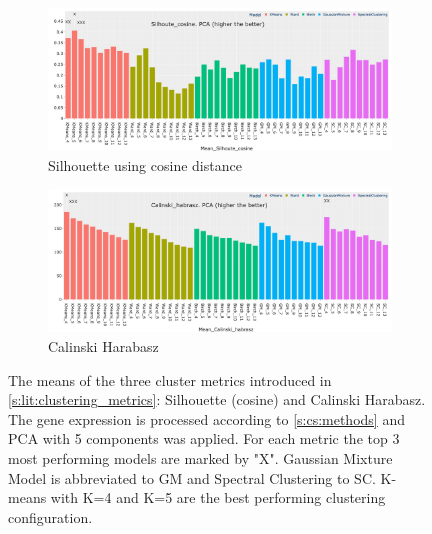 \begin{figure}[!t]
    \captionsetup[subfigure]{justification=Centering}
    \centering
    \begin{subfigure}[!t]{1.0\textwidth}
        \includegraphics[width=\textwidth,keepaspectratio]{Sections/ClusteringAnalysis/Resources/cs_top3/PCA_top3_Silhoute_cosine.png}
        \caption{Silhouette using cosine distance}
        \label{fig:cs:cosine}
    \end{subfigure}
    \centering
    \begin{subfigure}[!t]{1.0\textwidth}
        \includegraphics[width=\textwidth,keepaspectratio]{Sections/ClusteringAnalysis/Resources/cs_top3/PCA_top3_Calinski_habrasz.png}
        \caption{Calinski Harabasz}
        \label{fig:cs:cal_hab}
    \end{subfigure}
    \caption[Measuring clustering models: Silhouette and Calinski Habrasz]{The means of the three cluster metrics introduced in \cref{s:lit:clustering_metrics}: Silhouette (cosine) and Calinski Harabasz. The gene expression is processed according to \cref{s:cs:methods} and PCA with 5 components was applied. For each metric the top 3 most performing models are marked by "X". Gaussian Mixture Model is abbreviated to GM and Spectral Clustering to SC. K-means with K=4 and K=5 are the best performing clustering configuration.}
    \label{fig:cs:cs_metrics}
\end{figure}


